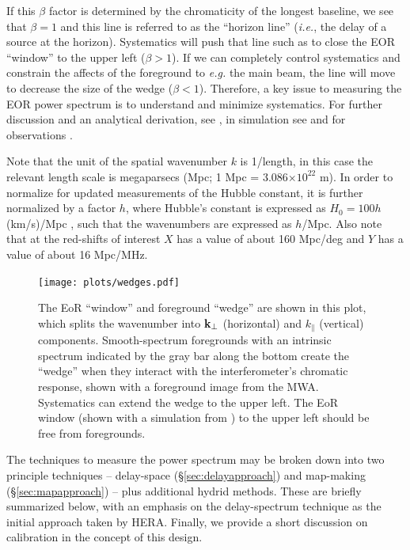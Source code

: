 \documentclass[preprint,11pt]{aastex}
\newcommand{\kvec}{{\bf k}}
\newcommand{\kvpr}{{\kvec_\perp}}
\def\kpar{k_{\|}}
\begin{document}
If this $\beta$ factor is determined by the chromaticity of the longest baseline, we see that $\beta=1$ and this line is referred to as the ``horizon line'' ({\em i.e.}, the delay of a source at the horizon).  Systematics will push that line such as to close the EOR ``window'' to the upper left ($\beta > 1$).  If we can completely control systematics and constrain the affects of the foreground to {\em e.g.} the main beam, the line will move to decrease the size of the wedge ($\beta<1$).
Therefore, a key issue to measuring the EOR power spectrum is to understand and minimize systematics.  For further discussion and an analytical derivation, see \cite{zahn_etal2012,vedantham_2012,liu_et_al2014b},  in simulation see \cite{datta_etal2010,hazelton_et_al2013} and for observations
\cite{pober_etal2013b,2015arXiv150601026P,parsons_etal2014,2015arXiv150206016A}.  


Note that the unit of the spatial wavenumber $k$ is 1/length, in this case the relevant length scale is megaparsecs (Mpc; 1 Mpc = 3.086$\times10^{22}$ m).  In order to normalize for updated measurements of the Hubble constant, it is further normalized by a factor $h$, where Hubble's constant is expressed as $H_0=100h$ (km/s)/Mpc , such that the wavenumbers are expressed as $h$/Mpc.  Also note that at the red-shifts of interest $X$ has a value of about 160 Mpc/deg and $Y$ has a value of about 16 Mpc/MHz.

\begin{figure}[t]
\centerline{
\texttt{[image: plots/wedges.pdf]}
}
\caption{The EoR ``window'' and foreground ``wedge'' are shown in this plot, which splits the wavenumber into $\kvpr$ (horizontal) and $\kpar$ (vertical) components.
Smooth-spectrum foregrounds with an intrinsic spectrum indicated by the gray bar along the bottom create the ``wedge'' when they interact with the interferometer's chromatic response, shown with a foreground image from the MWA.  Systematics can extend the wedge to the upper left.  The EoR window (shown with a simulation
from \citealt{mesinger_et_al2011}) to the upper left should be free from foregrounds.}
\label{fig:wedge}
\end{figure}

The techniques to measure the power spectrum may be broken down into two principle techniques -- delay-space (\S\ref{sec:delayapproach}) and map-making (\S\ref{sec:mapapproach}) -- plus additional hydrid methods.  These are briefly summarized below, with an emphasis on the delay-spectrum technique as the initial approach taken by HERA.  Finally, we provide a short discussion on calibration in the concept of this design.
\end{document}
